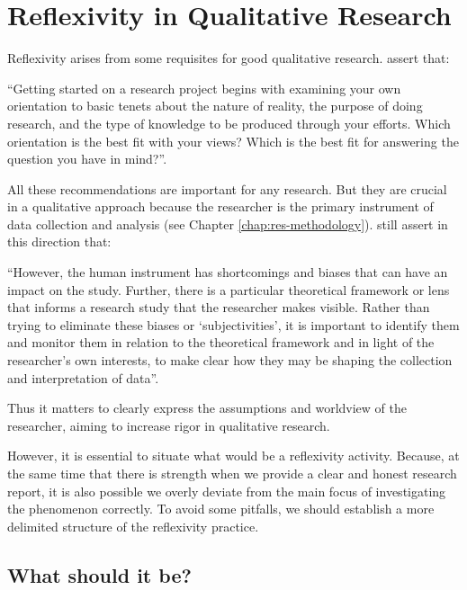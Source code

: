 \section{Reflexivity in Qualitative Research}
\label{reflexivity:qualitative-research}

Reflexivity arises from some requisites for good qualitative research.  assert that:
\begin{citacao}
    “Getting started on a research project begins with examining your own orientation to basic tenets about the nature of reality, the purpose of doing research, and the type of knowledge to be produced through your efforts. Which orientation is the best fit with your views? Which is the best fit for answering the question you have in mind?”.
\end{citacao}
All these recommendations are important for any research. But they are crucial in a qualitative approach because the researcher is the primary instrument of data collection and analysis (see Chapter \ref{chap:res-methodology}).  still assert in this direction that:
\begin{citacao}
    “However, the human instrument has shortcomings and biases that can have an impact on the study. Further, there is a particular theoretical framework or lens that informs a research study that the researcher makes visible. Rather than trying to eliminate these biases or ‘subjectivities’, it is important to identify them and monitor them in relation to the theoretical framework and in light of the researcher’s own interests, to make clear how they may be shaping the collection and interpretation of data”.    
\end{citacao}
Thus it matters to clearly express the assumptions and worldview of the researcher, aiming to increase rigor in qualitative research.

However, it is essential to situate what would be a reflexivity activity. Because, at the same time that there is strength when we provide a clear and honest research report, it is also possible we overly deviate from the main focus of investigating the phenomenon correctly. To avoid some pitfalls, we should establish a more delimited structure of the reflexivity practice.

\subsection{What should it be?}

